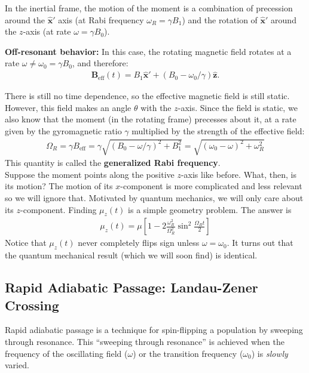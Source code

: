 \documentclass{book}
\theoremstyle{definition}
\newcommand{\f}[2]{\frac{#1}{#2}}
\newcommand{\lb}{\left[}
\newcommand{\rb}{\right]}
\begin{document}
In the inertial frame, the motion of the moment is a combination of precession around the $\hat{\bm{x}}'$ axis (at Rabi frequency $\omega_R = \gamma B_1$) and the rotation of $\hat{\bm{x}}'$ around the $z$-axis (at rate $\omega = \gamma B_0$). 


 




\noindent \textbf{Off-resonant behavior:}  In this case, the rotating magnetic field rotates at a rate $\omega \neq \omega_0 = \gamma B_0$, and therefore:
\begin{align*}
	\bm{B}_\text{eff}(t) = B_1 \hat{\bm{x}}' + (B_0 - \omega_0/\gamma) \hat{\bm{z}}.
\end{align*}

There is still no time dependence, so the effective magnetic field is still static. However, this field makes an angle $\theta$ with the $z$-axis. Since the field is static, we also know that the moment (in the rotating frame) precesses about it, at a rate given by the gyromagnetic ratio $\gamma$ multiplied by the strength of the effective field: 
\begin{align*}
	\boxed{\Omega_R = \gamma B_\text{eff} = \gamma \sqrt{(B_0 - \omega/\gamma)^2 + B_1^2} = \sqrt{(\omega_0 - \omega)^2 + \omega_R^2}}
\end{align*}
This quantity is called the \textbf{generalized Rabi frequency}.\\


Suppose the moment points along the positive $z$-axis like before. What, then, is its motion? The motion of its $x$-component is more complicated and less relevant so we will ignore that. Motivated by quantum mechanics, we will only care about its $z$-component. Finding $\mu_z(t)$ is a simple geometry problem. The answer is 
\begin{align*}
	\boxed{\mu_z(t) = \mu\lb 1 - 2\f{\omega_R^2}{\Omega_R^2}\sin^2 \f{\Omega_R t}{2} \rb}
\end{align*}
Notice that $\mu_z(t)$ never completely flips sign unless $\omega = \omega_0$. It turns out that the quantum mechanical result (which we will soon find) is identical. 




\subsection{Rapid Adiabatic Passage: Landau-Zener Crossing}

Rapid adiabatic passage is a technique for spin-flipping a population by sweeping through resonance. This ``sweeping through resonance'' is achieved when the frequency of the oscillating field ($\omega$) or the transition frequency ($\omega_0$) is \textit{slowly} varied. \\
\end{document}

